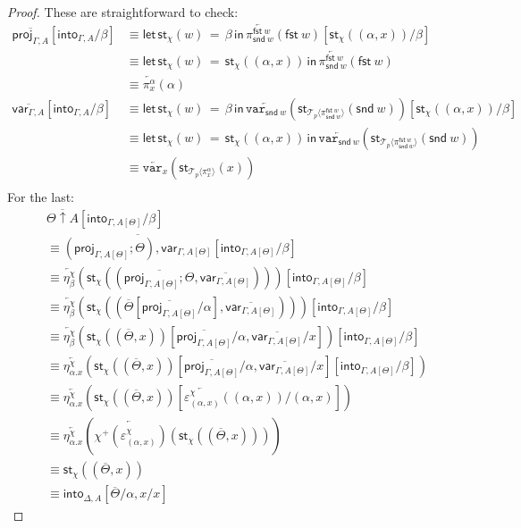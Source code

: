 \documentclass[10pt]{article}
\theoremstyle{definition}
\newcommand\dsd[1]{\ensuremath{\mathsf{#1}}}
\newcommand{\app}[2]{\ensuremath{#1 \: #2}}
\newcommand{\fst}[1]{\app{\dsd{fst}}{#1}}
\newcommand{\snd}[1]{\app{\dsd{snd}}{#1}}
\newcommand{\rewrite}[2]{\overleftarrow{#1}(#2)}
\newcommand\StI[2]{\ensuremath{\mathsf{st}_{#1}(#2)}}
\newcommand\StE[4]{\ensuremath{\mathsf{let} \, \StI{#1}{#3} \, = \, {#2} \, \mathsf{in} \, #4}}
\newcommand\TrPlus[2]{\ensuremath{{#1}^+(#2)}}
\newcommand\ApEl[2]{\mathcal{T}_{#1}\langle#2\rangle}
\newcommand{\upstairs}[1]{\overline{#1}}
\newcommand\proj[1]{\ensuremath{\mathsf{proj}_{#1}}}
\newcommand\qvar[1]{\ensuremath{\mathsf{var}_{#1}}}
\newcommand\into[1]{\ensuremath{\mathsf{into}_{#1}}}
\newcommand\var[1]{\ensuremath{\mathtt{var}_{#1}}}
\begin{document}
\begin{proof}
These are straightforward to check:
\begin{align*}
\upstairs{\proj{\Gamma, A}}[\into{\Gamma, A}/\beta] 
&\equiv \StE{\chi}{\beta}{w}{\rewrite{\pi^{\fst w}_{\snd w}}{\fst w}}[\StI{\chi}{(\alpha, x)}/\beta] \\
&\equiv \StE{\chi}{\StI{\chi}{(\alpha, x)}}{w}{\rewrite{\pi^{\fst w}_{\snd w}}{\fst w}} \\
&\equiv \rewrite{\pi^\alpha_x}{\alpha} \\
\upstairs{\qvar{\Gamma, A}}[\into{\Gamma, A}/\beta]
&\equiv  \StE{\chi}{\beta}{w}{\rewrite{\var{\snd w}}{\StI{\ApEl{p}{\pi^{\fst w}_{\snd w}}}{\snd w}}}[\StI{\chi}{(\alpha, x)}/\beta]  \\
&\equiv \StE{\chi}{\StI{\chi}{(\alpha, x)}}{w}{\rewrite{\var{\snd w}}{\StI{\ApEl{p}{\pi^{\fst w}_{\snd w}}}{\snd w}}} \\
&\equiv \rewrite{\var{x}}{\StI{\ApEl{p}{\pi^{\alpha}_x}}{x}} \\
\end{align*}
For the last:
\begin{align*}
&\upstairs{\Theta \uparrow A}[\into{\Gamma, A[\Theta]}/\beta] \\
&\equiv \upstairs{(\proj{\Gamma, A[\Theta]}; \Theta) , \qvar{\Gamma, A[\Theta]}} [\into{\Gamma, A[\Theta]}/\beta] \\
&\equiv \rewrite{\eta^\chi_\beta}{\StI{\chi}{(\upstairs{\proj{\Gamma, A[\Theta]}; \Theta}, \upstairs{\qvar{\Gamma, A[\Theta]}})}}[\into{\Gamma, A[\Theta]}/\beta] \\
&\equiv \rewrite{\eta^\chi_\beta}{\StI{\chi}{(\upstairs{\Theta}[\upstairs{\proj{\Gamma, A[\Theta]}}/\alpha], \upstairs{\qvar{\Gamma, A[\Theta]}})}}[\into{\Gamma, A[\Theta]}/\beta] \\
&\equiv \rewrite{\eta^\chi_\beta}{\StI{\chi}{(\upstairs{\Theta}, x)}[\upstairs{\proj{\Gamma, A[\Theta]}}/\alpha, \upstairs{\qvar{\Gamma, A[\Theta]}}/x]}[\into{\Gamma, A[\Theta]}/\beta] \\
&\equiv \rewrite{\eta^\chi_{\alpha.x}}{\StI{\chi}{(\upstairs{\Theta}, x)}[\upstairs{\proj{\Gamma, A[\Theta]}}/\alpha, \upstairs{\qvar{\Gamma, A[\Theta]}}/x][\into{\Gamma, A[\Theta]}/\beta]} \\
&\equiv \rewrite{\eta^\chi_{\alpha.x}}{\StI{\chi}{(\upstairs{\Theta}, x)}[\rewrite{\varepsilon^\chi_{(\alpha,x)}}{(\alpha,x)}/(\alpha,x)]} \\
&\equiv \rewrite{\eta^\chi_{\alpha.x}}{\rewrite{\TrPlus{\chi}{\varepsilon^\chi_{(\alpha,x)}}}{\StI{\chi}{(\upstairs{\Theta}, x)}}} \\
&\equiv \StI{\chi}{(\upstairs{\Theta}, x)} \\
&\equiv \into{\Delta, A}[\upstairs{\Theta}/\alpha, x / x]
\end{align*}
\end{proof}
\end{document}
